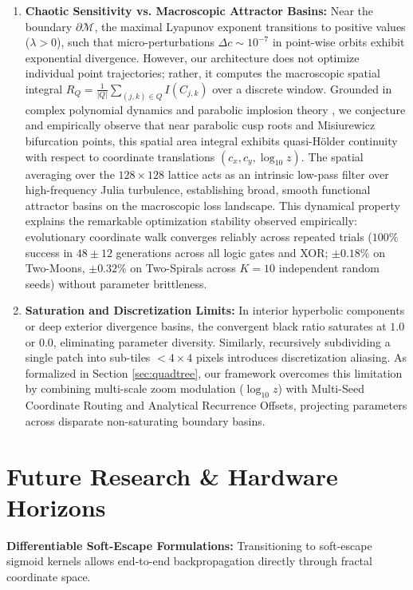 \documentclass[10pt,journal,compsoc,twocolumn]{article}
\begin{document}
\begin{enumerate}
    \item \textbf{Chaotic Sensitivity vs. Macroscopic Attractor Basins:} Near the boundary $\partial \mathcal{M}$, the maximal Lyapunov exponent transitions to positive values ($\lambda > 0$), such that micro-perturbations $\Delta c \sim 10^{-7}$ in point-wise orbits exhibit exponential divergence. However, our architecture does not optimize individual point trajectories; rather, it computes the macroscopic spatial integral $R_Q = \frac{1}{|Q|} \sum_{(j,k) \in Q} I(C_{j,k})$ over a discrete window. Grounded in complex polynomial dynamics and parabolic implosion theory \cite{peitgen1986beauty, peitgen1992chaos}, we conjecture and empirically observe that near parabolic cusp roots and Misiurewicz bifurcation points, this spatial area integral exhibits quasi-Hölder continuity with respect to coordinate translations $(c_x, c_y, \log_{10} z)$. The spatial averaging over the $128 \times 128$ lattice acts as an intrinsic low-pass filter over high-frequency Julia turbulence, establishing broad, smooth functional attractor basins on the macroscopic loss landscape. This dynamical property explains the remarkable optimization stability observed empirically: evolutionary coordinate walk converges reliably across repeated trials ($100\%$ success in $48 \pm 12$ generations across all logic gates and XOR; $\pm 0.18\%$ on Two-Moons, $\pm 0.32\%$ on Two-Spirals across $K=10$ independent random seeds) without parameter brittleness.
    \item \textbf{Saturation and Discretization Limits:} In interior hyperbolic components or deep exterior divergence basins, the convergent black ratio saturates at $1.0$ or $0.0$, eliminating parameter diversity. Similarly, recursively subdividing a single patch into sub-tiles $< 4 \times 4$ pixels introduces discretization aliasing. As formalized in Section \ref{sec:quadtree}, our framework overcomes this limitation by combining multi-scale zoom modulation ($\log_{10} z$) with Multi-Seed Coordinate Routing and Analytical Recurrence Offsets, projecting parameters across disparate non-saturating boundary basins.
\end{enumerate}

\section{Future Research \& Hardware Horizons}
\textbf{Differentiable Soft-Escape Formulations:} Transitioning to soft-escape sigmoid kernels allows end-to-end backpropagation directly through fractal coordinate space.
\end{document}

